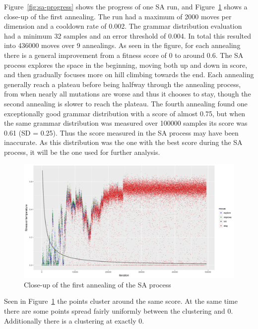 Figure~\ref{fig:sa-progress} shows the progress of one \gls{SA} run, and Figure~\ref{fig:sa-progress-close} shows a close-up of the first annealing.
The run had a maximum of 2000 moves per dimension and a cooldown rate of 0.002.
The grammar distribution evaluation had a minimum 32 samples and an error threshold of 0.004.
In total this resulted into 436000 moves over 9 annealings.
As seen in the figure, for each annealing there is a general improvement from a fitness score of 0 to around 0.6.
The \gls{SA} process explores the space in the beginning, moving both up and down in score, and then gradually focuses more on hill climbing towards the end.
Each annealing generally reach a plateau before being halfway through the annealing process, from when nearly all mutations are worse and thus it chooses to stay, though the second annealing is slower to reach the plateau.
The fourth annealing found one exceptionally good grammar distribution with a score of almost 0.75, but when the same grammar distribution was measured over 100000 samples its score was 0.61 (SD = 0.25).
Thus the score measured in the \gls{SA} process may have been inaccurate.
As this distribution was the one with the best score during the \gls{SA} process, it will be the one used for further analysis.

\begin{figure}
    \includegraphics[width=\textwidth]{figures/sa-progress-close}
    \caption[Close-up of the first annealing of the SA process]{Close-up of the first annealing of the \gls{SA} process}
    \label{fig:sa-progress-close}
\end{figure}

Seen in Figure~\ref{fig:sa-progress-close} the points cluster around the same score.
At the same time there are some points spread fairly uniformly between the clustering and 0.
Additionally there is a clustering at exactly 0.

